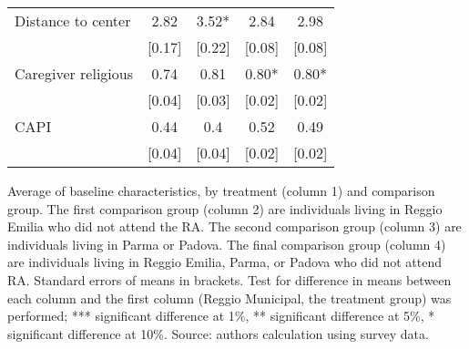\begin{table}[H]
\begin{tabular}{l cccc}
Distance to center   &   2.82   &   3.52*   &   2.84   &   2.98 \\ 
   &   [0.17]   &   [0.22]   &   [0.08]   &   [0.08] \\ 
Caregiver religious   &   0.74   &   0.81   &   0.80*   &   0.80* \\ 
   &   [0.04]   &   [0.03]   &   [0.02]   &   [0.02] \\ 
CAPI   &   0.44   &   0.4   &   0.52   &   0.49 \\ 
   &   [0.04]   &   [0.04]   &   [0.02]   &   [0.02] \\ 
\hline 
\end{tabular}
\vspace{1ex}

\raggedright{
\footnotesize{Average of baseline characteristics, by treatment (column 1) and comparison group.
The first comparison group (column 2) are individuals living in Reggio Emilia who did not attend the RA. The second comparison group (column 3) are individuals living in Parma or Padova. The final comparison group (column 4) are individuals living in Reggio Emilia, Parma, or Padova who did not attend RA.
Standard errors of means in brackets. Test for difference in means between each column and the first column (Reggio Municipal, the treatment group) was performed; *** significant difference at 1\%, ** significant difference at 5\%, * significant difference at 10\%. Source: authors calculation using survey data.}
}
\end{table}
